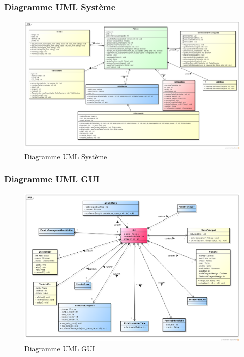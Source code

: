 \documentclass[12pt]{beamer}
\begin{document}
\begin{frame}
  \frametitle{Diagramme UML Système}
  \begin{figure}
    \includegraphics[scale=0.20]{data/UMLDiagram}
    \caption{Diagramme UML Système}
  \end{figure}
\end{frame}

\begin{frame}
  \frametitle{Diagramme UML GUI}
  \begin{figure}
    \includegraphics[scale=0.23]{data/UMLGUI}
    \caption{Diagramme UML GUI}
  \end{figure}
\end{frame}
\end{document}
